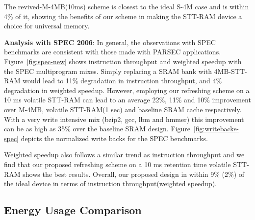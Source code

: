 The revived-M-4MB(10ms) scheme is closest to the ideal S-4M case and is within 4\% of it, showing the benefits of our scheme in making the STT-RAM device a choice for universal memory.

\begin{figure*} [t]
\centering
 \caption{\label{fig:spec-new} \scriptsize \bf Normalized Average Instruction Throughput(IT) and Weighted Speedup(WS) for SPEC 2006 multiprogrammed mixes. }
\end{figure*}

{\bf Analysis with SPEC 2006}: In general, the observations with SPEC benchmarks are consistent with those made with PARSEC applications. Figure~\ref{fig:spec-new} shows instruction throughput and weighted speedup with the  SPEC multiprogram
mixes. Simply replacing a SRAM bank with 4MB-STT-RAM would lead to 11\% degradation in instruction throughput, and 4\% degradation in weighted speedup. However, employing our refreshing scheme on a 10 ms volatile STT-RAM can lead to an average 22\%, 11\%  and 10\% improvement over M-4MB, volatile STT-RAM(1 sec) and baseline SRAM cache respectively. With a very write intensive mix (bzip2, gcc, lbm and hmmer) this improvement can be as high as 35\% over the baseline SRAM design. Figure~\ref{fig:writebacks-spec} depicts the normalized write backs for 
the SPEC benchmarks.


Weighted speedup also follows a similar trend as instruction throughput and we find that our proposed refreshing scheme on a 10 ms retention time volatile STT-RAM shows the best results. Overall, our proposed design in within 9\% (2\%) of the ideal device in terms of instruction throughput(weighted speedup).

\subsection{Energy Usage Comparison}

